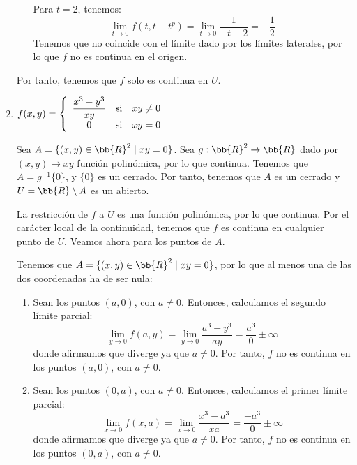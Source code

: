 \begin{ejercicio}
\begin{enumerate}
\begin{enumerate}
            Para $t=2$, tenemos:
            \begin{equation*}
                \lim_{t \to 0}f(t,t+t^p) = 
                \lim_{t \to 0} \frac{1}{-t -2} = -\frac{1}{2}
            \end{equation*}
            Tenemos que no coincide con el límite dado por los límites laterales, por lo que $f$ no es continua en el origen.
        \end{enumerate}

        Por tanto, tenemos que $f$ solo es continua en $U$.

        \item $\displaystyle
            f(x,y)=
            \left\{\begin{array}{ccc}
                \displaystyle \frac{x^3-y^3}{xy} &\text{si}& xy\neq 0\\
                0 &\text{si}& xy=0
            \end{array}\right. \displaystyle$

        Sea $A=\{(x,y)\in\bb{R}^2 \mid xy=0\}$. Sea $g:\bb{R}^2\to \bb{R}$ dado por $(x,y)\mapsto xy$ función polinómica, por lo que continua. Tenemos que $A=g^{-1}\{0\}$, y $\{0\}$ es un cerrado. Por tanto, tenemos que $A$ es un cerrado y $U=\bb{R}\setminus A$ es un abierto.
    
        La restricción de $f$ a $U$ es una función polinómica, por lo que continua. Por el carácter local de la continuidad, tenemos que $f$ es continua en cualquier punto de $U$. Veamos ahora para los puntos de $A$.

        Tenemos que $A=\{(x,y)\in\bb{R}^2 \mid xy=0\}$, por lo que al menos una de las dos coordenadas ha de ser nula:
        \begin{enumerate}
            \item Sean los puntos $(a,0)$, con $a\neq 0$. Entonces, calculamos el segundo límite parcial:
            \begin{equation*}
                \lim_{y\to 0}f(a,y)
                = \lim_{y\to 0} \frac{a^3-y^3}{ay}
                = \frac{a^3}{0}\pm \infty
            \end{equation*}
            donde afirmamos que diverge ya que $a\neq 0$. Por tanto, $f$ no es continua en los puntos $(a,0)$, con $a\neq 0$.

            \item Sean los puntos $(0,a)$, con $a\neq 0$. Entonces, calculamos el primer límite parcial:
            \begin{equation*}
                \lim_{x\to 0}f(x,a)
                = \lim_{x\to 0} \frac{x^3-a^3}{xa}
                = \frac{-a^3}{0}\pm \infty
            \end{equation*}
            donde afirmamos que diverge ya que $a\neq 0$. Por tanto, $f$ no es continua en los puntos $(0,a)$, con $a\neq 0$.


\end{enumerate}
\end{enumerate}
\end{ejercicio}
